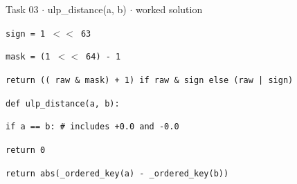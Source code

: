 \documentclass[11pt]{article}
\begin{document}
\begin{keepsection}
\begin{workedbox}{Task 03 \ensuremath{\cdot} ulp\_distance(a, b) \ensuremath{\cdot} worked solution}
\begin{enumerate}
\begin{tcolorbox}[colback=Paperblue,colframe=Paperblue,boxrule=0pt,arc=0pt,left=7pt,right=7pt,top=5pt,bottom=5pt]
\noindent\hspace*{1em}\texttt{sign = 1 \ensuremath{<}\ensuremath{<} 63}\par
\noindent\hspace*{1em}\texttt{mask = (1 \ensuremath{<}\ensuremath{<} 64) - 1}\par
\noindent\hspace*{1em}\texttt{return ((~raw \& mask) + 1) if raw \& sign else (raw | sign)}\par
\noindent\hspace*{0em}\texttt{}\par
\noindent\hspace*{0em}\texttt{def ulp\_distance(a, b):}\par
\noindent\hspace*{1em}\texttt{if a == b: \# includes +0.0 and -0.0}\par
\noindent\hspace*{3em}\texttt{return 0}\par
\noindent\hspace*{1em}\texttt{return abs(\_ordered\_key(a) - \_ordered\_key(b))}\par
\end{tcolorbox}
\end{enumerate}
\end{workedbox}

\end{keepsection}
\end{document}
